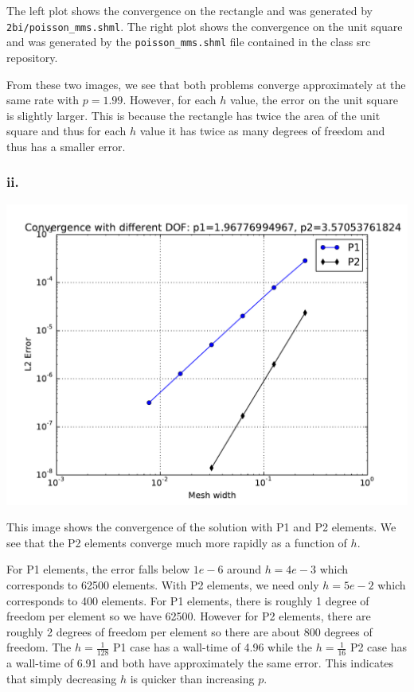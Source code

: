\documentclass{article}
\begin{document}
The left plot shows the convergence on the rectangle and was generated by \verb|2bi/poisson_mms.shml|. The right plot shows the convergence on the unit square and was generated by the \verb|poisson_mms.shml| file contained in the class src repository.

From these two images, we see that both problems converge approximately at the same rate with $p=1.99$. However, for each $h$ value, the error on the unit square is slightly larger. This is because the rectangle has twice the area of the unit square and thus for each $h$ value it has twice as many degrees of freedom and thus has a smaller error.

\subsubsection*{ii.}
\includegraphics[width=\linewidth]{2biiConvergence.pdf}

This image shows the convergence of the solution with P1 and P2 elements. We see that the P2 elements converge much more rapidly as a function of $h$.

For P1 elements, the error falls below $1e-6$ around $h=4e-3$ which corresponds to 62500 elements. With P2 elements, we need only $h=5e-2$ which corresponds to 400 elements. For P1 elements, there is roughly 1 degree of freedom per element so we have 62500. However for P2 elements, there are roughly 2 degrees of freedom per element so there are about 800 degrees of freedom. The $h=\frac{1}{128}$ P1 case has a wall-time of 4.96 while the $h=\frac{1}{16}$ P2 case has a wall-time of 6.91 and both have approximately the same error. This indicates that simply decreasing $h$ is quicker than increasing $p$.
\end{document}
